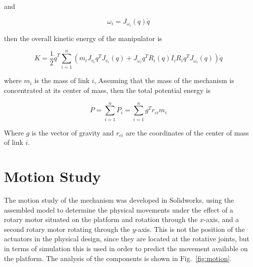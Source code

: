 \documentclass[titlepage, letterpaper]{article}
\begin{document}
and 

\begin{equation}
    \label{eq:dynamiv_omegai}
    \omega_i = J_{\omega_i}(q)\dot{q}
\end{equation}

then the overall kinetic energy of the manipulator is

\begin{equation}
    \label{eq:kinetic_energy}
    K = \frac{1}{2}\dot{q}^T \sum_{i=1}^n (m_i J_{v_i} q^T J_{v_i}(q) + J_{\omega_i} q^T R_i (q) I_i R_i q^T J_{\omega_i} (q)) \dot{q}
\end{equation}

where $m_i$ is the mass of link $i$,
Assuming that the mass of the mechanism is concentrated at its center of mass, then the total potential energy is

\begin{equation}
    \label{eq:potential_energy}
    P = \sum_{i=1}^n P_i = \sum_{i=1}^n g^T r_{ci} m_i
\end{equation}

Where $g$ is the vector of gravity and $r_{ci}$ are the coordinates of the center of mass of link $i$.

\section{Motion Study}
\label{sec:motion_study}

The motion study of the mechanism was developed in Solidworks, using the assembled model to determine the physical movements under the effect of a rotary motor situated on the platform and rotation through the $x$-axis,
and a second rotary motor rotating through the $y$-axis.
This is not the position of the actuators in the physical design,
since they are located at the rotative joints,
but in terms of simulation this is used in order to predict the movement available on the platform.
The analysis of the components is shown in Fig.~\ref{fig:motion}.
\end{document}
